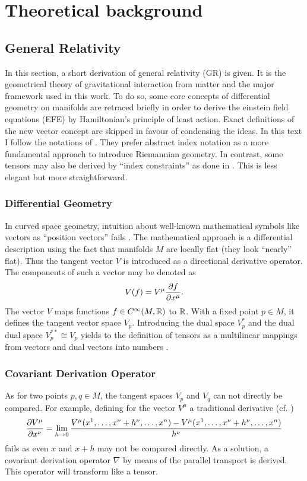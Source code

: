 \documentclass[12pt,a4paper]{report}
\numberwithin{equation}{chapter}
\begin{document}
\chapter{Theoretical background}\label{sec:GR}


\section{General Relativity}
In this section, a short derivation of general relativity (GR) is given. It is the geometrical theory of gravitational interaction from matter and the major framework used in this work. To do so, some core concepts of differential geometry on manifolds are retraced briefly in order to derive the einstein field equations (EFE) by Hamiltonian's principle of least action. Exact definitions of the new vector concept are skipped in favour of condensing the ideas. In this text I follow the notations of \cite{WaldGR,MTW,carroll,kochPhd,WaldTeaching}. They prefer abstract index notation as a more fundamental approach to introduce Riemannian geometry. In contrast, some tensors may also be derived by ``index constraints'' as done in \cite{fliessbach}. This is less elegant but more straightforward.


\subsection{Differential Geometry}
In curved space geometry, intuition about well-known mathematical symbols like vectors as ``position vectors'' fails \cite{WaldTeaching}. The mathematical approach is a differential description using the fact that manifolds $M$ are locally flat (they look ``nearly'' flat). Thus the tangent vector $V$ is introduced as a directional derivative operator. The components of such a vector may be denoted as
\begin{equation}
V(f) = V^\mu \frac{\partial f}{\partial x^\mu}.
\end{equation}
The vector $V$ maps functions $f \in C^\infty(M,\mathbb{R})$ to $\mathbb{R}$. With a fixed point $p\in M$, it defines the tangent vector space $V_p$. Introducing the dual space $V_p^*$ and the dual dual space $V_p^{**} \cong V_p$ yields to the definition of tensors as a multilinear mappings from vectors and dual vectors into numbers \cite{WaldGR}.

\subsection{Covariant Derivation Operator}
As for two points $p,q \in M$, the tangent spaces $V_p$ and $V_q$ can not directly be compared. For example, defining for the vector $V^\mu$ a traditional derivative (cf. \cite[page 208]{MTW})
\begin{equation}\label{eq:GR-deriv-wrong}
\frac{\partial V^\mu}{\partial x^\nu} =
\lim_{h\to 0}
\frac{V^\mu(x^1,\dots,x^\nu + h^\nu,\dots,x^n)
- V^\mu(x^1,\dots,x^\nu + h^\nu,\dots,x^n)}{h^\nu}
\end{equation} 
fails as even $x$ and $x+h$ may not be compared directly. As a solution, a covariant derivation operator $\nabla$ by means of the parallel transport is derived. This operator will transform like a tensor.
\end{document}
